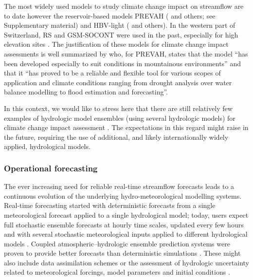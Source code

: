 \documentclass[10pt,a4paper]{article}
\begin{document}
The most widely used models to study climate change impact on streamflow are to date however the reservoir-based models PREVAH (\citealt{Koplin2012, Speich2015, Milano2015a, Brunner2019c} and others;  see Supplementary material) and HBV-light (\citealt{Etter2017, Hakala2020, Brunner2018, Jenicek2018}  and others). In the western part of Switzerland, RS and GSM-SOCONT were used in the past, especially for high elevation sites \citep{Horton2006, Uhlmann2013a, Uhlmann2013b, Terrier2015}. The justification of these models for climate change impact assessments is well summarized by \citet{Koplin2010} who, for PREVAH, states that the model ``has been developed especially to suit conditions in mountainous environments'' and that it ``has proved to be a reliable and flexible tool for various scopes of application and climate conditions ranging from drought analysis over water balance modelling to flood estimation and forecasting''. 

In this context, we would like to stress here that there are still relatively few examples of hydrologic model ensembles (using several hydrologic models) for climate change impact assessment \citep{Kobierska2011, Bosshard2013a, Addor2014}. The expectations in this regard might raise in the future, requiring the use of additional, and likely internationally widely applied, hydrological models.


\subsubsection{Operational forecasting}
\label{sec:application:forecasting}

The ever increasing need for reliable real-time streamflow forecasts leads to a continuous evolution of the underlying hydro-meteorological modelling systems. Real-time forecasting started with deterministic forecasts from a single meteorological forecast applied to a single hydrological model; today, users expect full stochastic ensemble forecasts at hourly time scales, updated every few hours and with several stochastic meteorological inputs applied to different hydrological models \citep{Jasper2016}. Coupled atmospheric--hydrologic ensemble prediction systems were proven to provide better forecasts than deterministic simulations \citep{Verbunt2007, Zappa2008, Jaun2008, Liechti2013}. These might also include data assimilation schemes \citep{Jorg-Hess2015a} or the assessment of hydrologic uncertainty related to meteorological forcings, model parameters and initial conditions \citep{Jaun2009, Zappa2011a, Fundel2011}.
\end{document}
